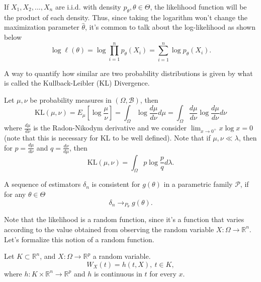 If $X_1,X_2,...,X_n$ are i.i.d. with density $p_\theta, \theta \in \Theta$,
the likelihood function will be the product of each density. Thus,
since taking the logarithm won't change the maximization parameter $\hat \theta$,
it's common to talk about the log-likelihood as shown below
\begin{equation}
	\log \ell(\theta) = \log \prod^n_{i=1} p_\theta(X_i)=
	\sum^n_{i=1} \log p_\theta(X_i).
\end{equation}

A way to quantify how similar are two probability distributions is given by
what is called the Kullback-Leibler (KL) Divergence.

\begin{definition}
	Let $\mu,\nu$ be probability measures in $(\Omega, \mathcal B)$, then
	\begin{equation}
		\text{KL}(\mu,\nu) =
		E_{\mu}\left[\log\frac{\mu}{\nu}\right]
		=\int_\Omega \log\frac{d\mu}{d\nu}d\mu
		=\int_\Omega \frac{d\mu}{d\nu}\log\frac{d\mu}{d\nu}d\nu
	\end{equation}
	where $\frac{d\mu}{d\nu}$ is the Radon-Nikodym derivative and
	we consider $\lim_{x\to 0^+} x \log x = 0$ (note that this is necessary for KL to be well defined).
	Note that if $\mu,\nu \ll \lambda$, then for $p = \frac{d\mu}{d\nu}$ and $q = \frac{d\nu}{d\mu}$, then
	\begin{equation}
		\text{KL}(\mu,\nu)
		=\int_\Omega p \log\frac{p}{q}d\lambda.
	\end{equation}
\end{definition}

\begin{definition}
	A sequence of estimators $\delta_n$ is consistent for $g(\theta)$ in a parametric family
	$\mathcal P$, if for any $\theta \in \Theta$
	\begin{equation}
		\delta_n \to_{P_\theta} g(\theta).
	\end{equation}
\end{definition}

Note that the likelihood is a random function, since it's a function that varies according
to the value obtained from observing the random variable $X:\Omega \to \mathbb R^n$. Let's
formalize this notion of a random function.

\begin{definition}
	Let $K \subset \mathbb R^n$, and $X:\Omega \to \mathbb R^p$ a random variable.
	\begin{equation}
		W_X(t) = h(t,X), \ t \in K,
	\end{equation}
	where $h:K\times \mathbb R^n \to \mathbb R^p$ and $h$ is continuous in $t$ for every $x$.
\end{definition}

